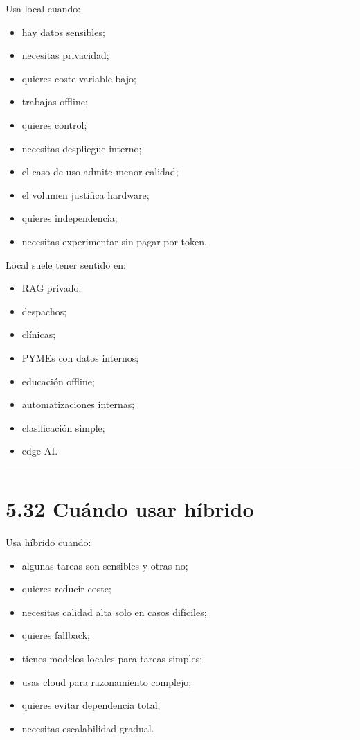 Usa local cuando:

\begin{itemize}
\tightlist
\item
  hay datos sensibles;
\item
  necesitas privacidad;
\item
  quieres coste variable bajo;
\item
  trabajas offline;
\item
  quieres control;
\item
  necesitas despliegue interno;
\item
  el caso de uso admite menor calidad;
\item
  el volumen justifica hardware;
\item
  quieres independencia;
\item
  necesitas experimentar sin pagar por token.
\end{itemize}

Local suele tener sentido en:

\begin{itemize}
\tightlist
\item
  RAG privado;
\item
  despachos;
\item
  clínicas;
\item
  PYMEs con datos internos;
\item
  educación offline;
\item
  automatizaciones internas;
\item
  clasificación simple;
\item
  edge AI.
\end{itemize}

\begin{center}\rule{0.5\linewidth}{0.5pt}\end{center}

\section{5.32 Cuándo usar híbrido}\label{cuuxe1ndo-usar-huxedbrido}

Usa híbrido cuando:

\begin{itemize}
\tightlist
\item
  algunas tareas son sensibles y otras no;
\item
  quieres reducir coste;
\item
  necesitas calidad alta solo en casos difíciles;
\item
  quieres fallback;
\item
  tienes modelos locales para tareas simples;
\item
  usas cloud para razonamiento complejo;
\item
  quieres evitar dependencia total;
\item
  necesitas escalabilidad gradual.
\end{itemize}

